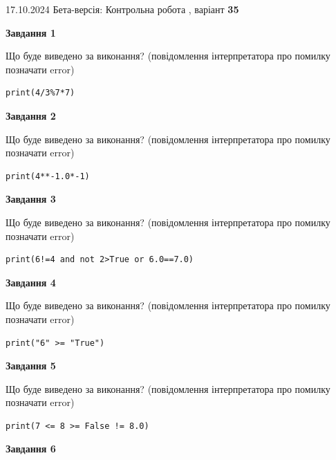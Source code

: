 \documentclass[12pt, ukrainian]{article}
\begin{document}
{\Large{17.10.2024 Бета-версія: Контрольна робота , варіант  \No \textbf { 35 }\par}}
{
\begin {large}
{\begin {center}\textbf{Завдання 1}\end {center}}

Що буде виведено за виконання? (повідомлення інтерпретатора про помилку позначати error)\par
\begin{verbatim}
print(4/3%7*7)
\end{verbatim}

{\begin {center}\textbf{Завдання 2}\end {center}}

Що буде виведено за виконання? (повідомлення інтерпретатора про помилку позначати error)\par
\begin{verbatim}
print(4**-1.0*-1)
\end{verbatim}

{\begin {center}\textbf{Завдання 3}\end {center}}

Що буде виведено за виконання? (повідомлення інтерпретатора про помилку позначати error)\par
\begin{verbatim}
print(6!=4 and not 2>True or 6.0==7.0)
\end{verbatim}

{\begin {center}\textbf{Завдання 4}\end {center}}

Що буде виведено за виконання? (повідомлення інтерпретатора про помилку позначати error)\par
\begin{verbatim}
print("6" >= "True")
\end{verbatim}

{\begin {center}\textbf{Завдання 5}\end {center}}

Що буде виведено за виконання? (повідомлення інтерпретатора про помилку позначати error)\par
\begin{verbatim}
print(7 <= 8 >= False != 8.0)
\end{verbatim}

{\begin {center}\textbf{Завдання 6}\end {center}}


\end{large}}
\end{document}
